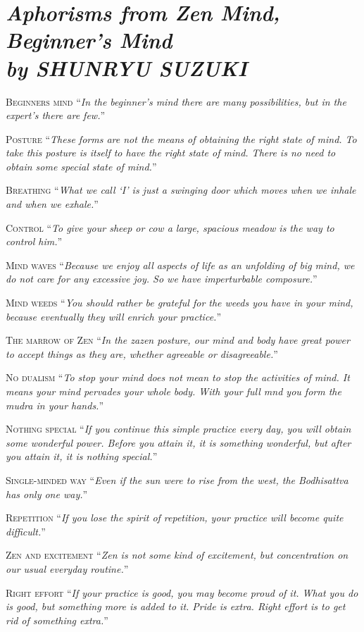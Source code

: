 \documentclass[14pt]{extarticle}
\newcommand{\aphor}[3]{
    \lettrine[lines=2, lraise=0.15]{#1}{#2}
    \enquote{\textit{#3}}
}
\begin{document}
\section*{\LARGE\sffamily\slshape Aphorisms from Zen Mind, Beginner's Mind \\ {\large by SHUNRYU SUZUKI }}
\aphor{B}{eginners mind} {In the beginner's mind there are many possibilities, but in the expert's there are few.}

\aphor{P}{osture} {These forms are not the means of obtaining the right state of mind. To take this posture is itself to have the right state of mind. There is no need to obtain some special state of mind.}

\aphor{B}{reathing} {What we call \enquote{I} is just a swinging door which moves when we inhale and when we exhale.}

\aphor{C}{ontrol} {To give your sheep or cow a large, spacious meadow is the way to control him.}

\aphor{M}{ind waves} {Because we enjoy all aspects of life as an unfolding of big mind, we do not care for any excessive joy. So we have imperturbable composure.}

\aphor{M}{ind weeds} {You should rather be grateful for the weeds you have in your mind, because eventually they will enrich your practice.}


\aphor{T}{he marrow of Zen} {In the zazen posture, our mind and body have great power to accept things as they are, whether agreeable or disagreeable.}


\aphor{N}{o dualism} {To stop your mind does not mean to stop the activities of mind. It means your mind pervades your whole body. With your full mnd you form the mudra in your hands.}

\pagebreak

\aphor{N}{othing special} {If you continue this simple practice every day, you will obtain some wonderful power. Before you attain it, it is something wonderful, but after you attain it, it is nothing special.}

\aphor{S}{ingle-minded way} {Even if the sun were to rise from the west, the Bodhisattva has only one way.}

\aphor{R}{epetition} {If you lose the spirit of repetition, your practice will become quite difficult.}

\aphor{Z}{en and excitement} {Zen is not some kind of excitement, but concentration on our usual everyday routine.}

\aphor{R}{ight effort} {If your practice is good, you may become proud of it. What you do is good, but something more is added to it. Pride is extra. Right effort is to get rid of something extra.}
\end{document}

